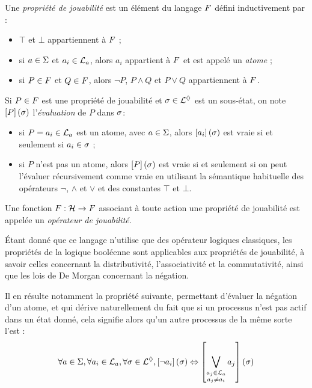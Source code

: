 \begin{definition}
  Une \emph{propriété de jouabilité} est un élément du langage $F$ défini inductivement
   par :
  \begin{itemize}
    \item $\top$ et $\bot$ appartiennent à $F$ ;
    \item si $a \in \Sigma$ et $a_i \in \mathcal{L}_a$, alors $a_i$ appartient à $F$
      et est appelé un \emph{atome} ;
    \item si $P \in F$ et $Q \in F$,
      alors $\neg P$, $P \wedge Q$ et $P \vee Q$ appartiennent à $F$.
  \end{itemize}
%
  Si $P \in F$ est une propriété de jouabilité et $\sigma \in \mathcal{L}^\lozenge$ est un sous-état,
  on note $\left[P\right](\sigma)$ l'\emph{évaluation} de $P$ dans $\sigma$:
  \begin{itemize}
    \item si $P = a_i \in \mathcal{L}_a$ est un atome, avec $a \in \Sigma$,
      alors $\left[a_i\right](\sigma)$ est vraie si et seulement si $a_i \in \sigma$ ;
    \item si $P$ n'est pas un atome, alors $\left[P\right](\sigma)$ est vraie si et seulement si
      on peut l'évaluer récursivement comme vraie en utilisant la sémantique habituelle des
      opérateurs $\neg$, $\wedge$ et $\vee$ et des constantes $\top$ et $\bot$.
  \end{itemize}
%
  Une fonction $F : \mathcal{H} \rightarrow F$ associant à toute action une propriété de jouabilité
  est appelée un \emph{opérateur de jouabilité}.
\end{definition}

Étant donné que ce langage n'utilise que des opérateur logiques classiques,
les propriétés de la logique booléenne sont applicables aux propriétés de jouabilité,
à savoir celles concernant la distributivité, l'associativité et la commutativité,
ainsi que les lois de De Morgan concernant la négation.

Il en résulte notamment la propriété suivante, permettant d'évaluer la négation d'un atome,
et qui dérive naturellement du fait que si un processus n'est pas actif dans un état donné,
cela signifie alors qu'un autre processus de la même sorte l'est :
\[\forall a \in \Sigma, \forall a_i \in \mathcal{L}_a, \forall \sigma \in \mathcal{L}^\lozenge,
  \left[\neg a_i\right](\sigma) \Leftrightarrow
  \left[\bigvee_{\substack{a_j \in \mathcal{L}_a\\a_j \neq a_i}} a_j\right](\sigma)\]

